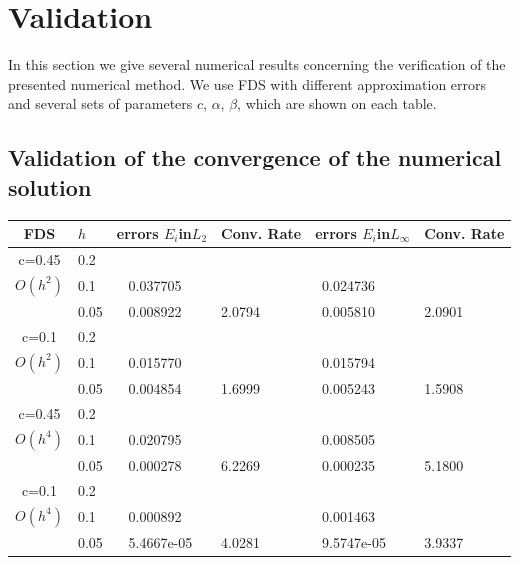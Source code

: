 \documentclass[preprint]{elsarticle}
\begin{document}
\section{Validation}\label{validation}

In this section we give several numerical results concerning the verification of  the presented numerical method. 
 We use FDS with different approximation errors and several sets  of  parameters $c$, $\alpha$, $\beta$,  which are shown on each table. 

 \subsection{Validation of the convergence of the numerical solution}\label{val-conv}
\begin{center}
\begin{table}[ht]
\centering
		\begin{tabular}{||c|l|ll|ll||}
			\hline
			\hline
      FDS       & $h$ &errors $E_i$in$L_2$&Conv. Rate& errors $E_i$in$L_\infty$&Conv. Rate\\
   			\hline 
					\hline 
      c=0.45    &0.2    &             &            &           &   \\
   $O(h^2)$     &0.1    &~ 0.037705  &            &~0.024736 &   \\
                &0.05   &~ 0.008922  &2.0794  &~0.005810 & 2.0901 \\
               	 \hline 
     c=0.1      &0.2   &             &           &                & \\
     $O(h^2)$   &0.1   &~ 0.015770  &             &~0.015794      &    \\
                &0.05  &~ 0.004854 & 1.6999       &~0.005243      & 1.5908  \\
			\hline
			\hline 	
      c=0.45    &0.2   &            &            &             &    \\
       $O(h^4)$ &0.1   &~ 0.020795   &           &~0.008505  &   \\
                &0.05  &~ 0.000278 & 6.2269    &~0.000235  & 5.1800  \\
					  			\hline 	
     c=0.1      &0.2  &            &               &               &     \\
     $O(h^4)$  &0.1   &~ 0.000892  &              &~0.001463      &        \\
               &0.05  &~ 5.4667e-05&4.0281        &~9.5747e-05 &  3.9337        \\
			\hline
    \hline

\end{tabular}
\end{table}
\end{center}
\end{document}
